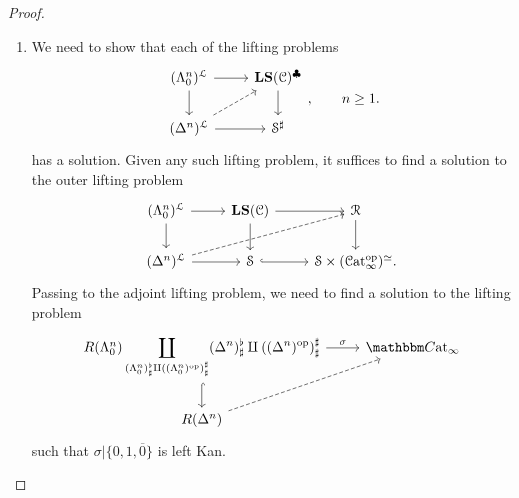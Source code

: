 \documentclass[main.tex]{subfiles}
\begin{document}
\begin{proof}
\begin{enumerate}
    \item We need to show that each of the lifting problems
      \begin{equation*}
        \begin{tikzcd}
          (\Lambda^{n}_{0})^{\mathcal{L}}
          \arrow[r]
          \arrow[d]
          & \LS(\category{C})^{\clubsuit}
          \arrow[d]
          \\
          (\Delta^{n})^{\mathcal{L}}
          \arrow[r]
          \arrow[ur, dashed]
          & \S^{\sharp}
        \end{tikzcd},\qquad n \geq 1.
      \end{equation*}
      has a solution. Given any such lifting problem, it suffices to find a solution to the outer lifting problem
      \begin{equation*}
        \begin{tikzcd}
          (\Lambda^{n}_{0})^{\mathcal{L}}
          \arrow[r]
          \arrow[d]
          & \LS(\category{C})
          \arrow[d]
          \arrow[r]
          & \mathcal{R}
          \arrow[d]
          \\
          (\Delta^{n})^{\mathcal{L}}
          \arrow[r]
          \arrow[urr, dashed]
          & \S
          \arrow[r, hook]
          & \S \times (\ICat\op)^{\simeq}.
        \end{tikzcd}
      \end{equation*}
      Passing to the adjoint lifting problem, we need to find a solution to the lifting problem
      \begin{equation*}
        \begin{tikzcd}
          R(\Lambda^{n}_{0}) \displaystyle\coprod_{(\Lambda^{n}_{0})^{\flat}_{\sharp} \amalg ((\Lambda^{n}_{0})\op)^{\sharp}_{\sharp}}(\Delta^{n})^{\flat}_{\sharp} \amalg ((\Delta^{n})\op)^{\sharp}_{\sharp}
          \arrow[r, "\sigma"]
          \arrow[d, hook]
          & \ICCat
          \\
          R(\Delta^{n})
          \arrow[ur, dashed]
        \end{tikzcd}
      \end{equation*}
      such that $\sigma|\{0,1,\overline{0}\}$ is left Kan.


\end{enumerate}
\end{proof}
\end{document}

